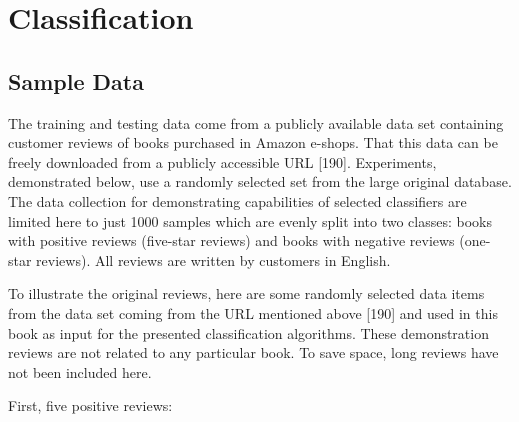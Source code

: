 \documentclass[11pt,openany,executivepaper]{book}
\begin{document}
\chapter{Classification} %
\section{Sample Data}
The training and testing data come from a publicly available data set containing 
customer reviews of books purchased in Amazon e-shops. That this data can be 
freely downloaded from a publicly accessible URL [190]. Experiments, demonstrated 
below, use a randomly selected set from the large original database. The data 
collection for demonstrating capabilities of selected classifiers are limited 
here to just 1000 samples which are evenly split into two classes: books with 
positive reviews (five-star reviews) and books with negative reviews (one-star 
reviews). All reviews are written by customers in English.

To illustrate the original reviews, here are some randomly selected data items
from the data set coming from the URL mentioned above [190] and used in this
book as input for the presented classification algorithms. These demonstration
reviews are not related to any particular book. To save space, long reviews have
not been included here.

First, five positive reviews:
\end{document}
